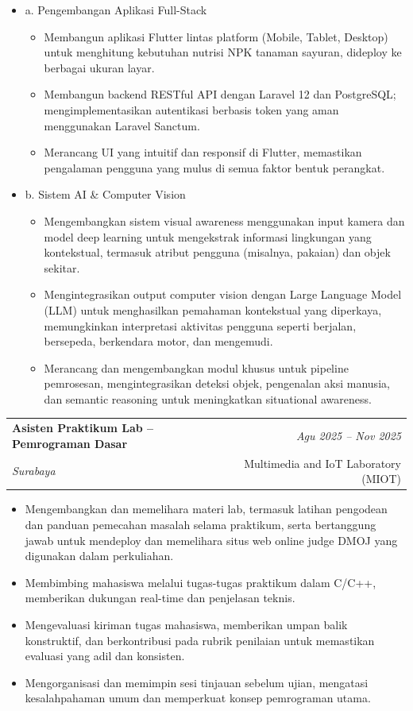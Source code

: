 \documentclass[a4paper,11pt]{article}
\makeatletter
\newcommand{\resumeSubheading}[4]{
\vspace{0.5mm}\item
    \begin{tabular*}{0.98\textwidth}[t]{l@{\extracolsep{\fill}}r}
        \textbf{#1} & \textit{\footnotesize{#4}} \\
        \textit{\footnotesize{#3}} &  \footnotesize{#2}\\
    \end{tabular*}
    \vspace{-2.4mm}
}
\newcommand{\resumeItemListStart}{\begin{justify}\begin{itemize}[leftmargin=3ex, rightmargin=2ex, noitemsep,labelsep=1.2mm,itemsep=0mm]\small}
\newcommand{\resumeItemListEnd}{\end{itemize}\end{justify}\vspace{-2mm}}
\makeatother
\begin{document}
\vspace{0mm}
\begin{itemize}[leftmargin=1.5ex, label={}]

\item{a. Pengembangan Aplikasi Full-Stack}
    \begin{itemize}[label=-]
        \item {Membangun aplikasi Flutter lintas platform (Mobile, Tablet, Desktop) untuk menghitung kebutuhan nutrisi NPK tanaman sayuran, dideploy ke berbagai ukuran layar.}
        \item {Membangun backend RESTful API dengan Laravel 12 dan PostgreSQL; mengimplementasikan autentikasi berbasis token yang aman menggunakan Laravel Sanctum.}
        \item {Merancang UI yang intuitif dan responsif di Flutter, memastikan pengalaman pengguna yang mulus di semua faktor bentuk perangkat.}
    \end{itemize}

\item{b. Sistem AI \& Computer Vision}
    \begin{itemize}[label=-]
        \item {Mengembangkan sistem visual awareness menggunakan input kamera dan model deep learning untuk mengekstrak informasi lingkungan yang kontekstual, termasuk atribut pengguna (misalnya, pakaian) dan objek sekitar.}
        \item {Mengintegrasikan output computer vision dengan Large Language Model (LLM) untuk menghasilkan pemahaman kontekstual yang diperkaya, memungkinkan interpretasi aktivitas pengguna seperti berjalan, bersepeda, berkendara motor, dan mengemudi.}
        \item {Merancang dan mengembangkan modul khusus untuk pipeline pemrosesan, mengintegrasikan deteksi objek, pengenalan aksi manusia, dan semantic reasoning untuk meningkatkan situational awareness.}
    \end{itemize}
\end{itemize}

\newpage
\resumeSubheading
{Asisten Praktikum Lab -- Pemrograman Dasar}{Multimedia and IoT Laboratory (MIOT)}
{Surabaya}{Agu 2025 -- Nov 2025}
\resumeItemListStart
\item {Mengembangkan dan memelihara materi lab, termasuk latihan pengodean dan panduan pemecahan masalah selama praktikum, serta bertanggung jawab untuk mendeploy dan memelihara situs web online judge DMOJ yang digunakan dalam perkuliahan.}
\item {Membimbing mahasiswa melalui tugas-tugas praktikum dalam C/C++, memberikan dukungan real-time dan penjelasan teknis.}
\item {Mengevaluasi kiriman tugas mahasiswa, memberikan umpan balik konstruktif, dan berkontribusi pada rubrik penilaian untuk memastikan evaluasi yang adil dan konsisten.}
\item {Mengorganisasi dan memimpin sesi tinjauan sebelum ujian, mengatasi kesalahpahaman umum dan memperkuat konsep pemrograman utama.}
\resumeItemListEnd
\vspace{-2mm}
\end{document}
